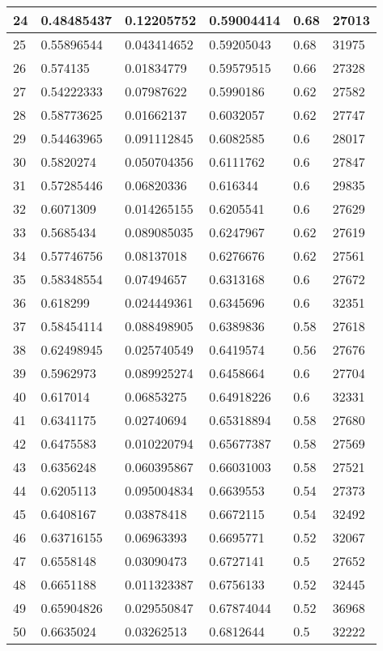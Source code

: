 \begin{longtable}{|l|l|l|l|l|l|}
24 & 0.48485437 & 0.12205752 & 0.59004414 & 0.68 & 27013 \\ \hline 
25 & 0.55896544 & 0.043414652 & 0.59205043 & 0.68 & 31975 \\ \hline 
26 & 0.574135 & 0.01834779 & 0.59579515 & 0.66 & 27328 \\ \hline 
27 & 0.54222333 & 0.07987622 & 0.5990186 & 0.62 & 27582 \\ \hline 
28 & 0.58773625 & 0.01662137 & 0.6032057 & 0.62 & 27747 \\ \hline 
29 & 0.54463965 & 0.091112845 & 0.6082585 & 0.6 & 28017 \\ \hline 
30 & 0.5820274 & 0.050704356 & 0.6111762 & 0.6 & 27847 \\ \hline 
31 & 0.57285446 & 0.06820336 & 0.616344 & 0.6 & 29835 \\ \hline 
32 & 0.6071309 & 0.014265155 & 0.6205541 & 0.6 & 27629 \\ \hline 
33 & 0.5685434 & 0.089085035 & 0.6247967 & 0.62 & 27619 \\ \hline 
34 & 0.57746756 & 0.08137018 & 0.6276676 & 0.62 & 27561 \\ \hline 
35 & 0.58348554 & 0.07494657 & 0.6313168 & 0.6 & 27672 \\ \hline 
36 & 0.618299 & 0.024449361 & 0.6345696 & 0.6 & 32351 \\ \hline 
37 & 0.58454114 & 0.088498905 & 0.6389836 & 0.58 & 27618 \\ \hline 
38 & 0.62498945 & 0.025740549 & 0.6419574 & 0.56 & 27676 \\ \hline 
39 & 0.5962973 & 0.089925274 & 0.6458664 & 0.6 & 27704 \\ \hline 
40 & 0.617014 & 0.06853275 & 0.64918226 & 0.6 & 32331 \\ \hline 
41 & 0.6341175 & 0.02740694 & 0.65318894 & 0.58 & 27680 \\ \hline 
42 & 0.6475583 & 0.010220794 & 0.65677387 & 0.58 & 27569 \\ \hline 
43 & 0.6356248 & 0.060395867 & 0.66031003 & 0.58 & 27521 \\ \hline 
44 & 0.6205113 & 0.095004834 & 0.6639553 & 0.54 & 27373 \\ \hline 
45 & 0.6408167 & 0.03878418 & 0.6672115 & 0.54 & 32492 \\ \hline 
46 & 0.63716155 & 0.06963393 & 0.6695771 & 0.52 & 32067 \\ \hline 
47 & 0.6558148 & 0.03090473 & 0.6727141 & 0.5 & 27652 \\ \hline 
48 & 0.6651188 & 0.011323387 & 0.6756133 & 0.52 & 32445 \\ \hline 
49 & 0.65904826 & 0.029550847 & 0.67874044 & 0.52 & 36968 \\ \hline 
50 & 0.6635024 & 0.03262513 & 0.6812644 & 0.5 & 32222 \\ \hline 
\end{longtable}